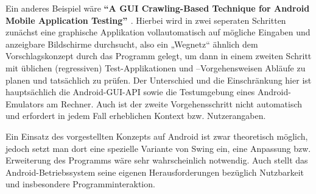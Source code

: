 Ein anderes Beispiel wäre \textbf{``A GUI Crawling-Based Technique for Android Mobile Application
Testing'' \cite{AGCBTFAMAT}}. Hierbei wird in zwei seperaten Schritten zunächst eine graphische Applikation
vollautomatisch auf mögliche Eingaben und anzeigbare Bildschirme durchsucht, also ein
„Wegnetz“ ähnlich dem Vorschlagskonzept durch das Programm gelegt, um dann in einem zweiten
Schritt mit üblichen (regressiven) Test-Applikationen und –Vorgehensweisen Abläufe zu
planen und tatsächlich zu prüfen. Der Unterschied und die Einschränkung hier ist
hauptsächlich die Android-GUI-API sowie die Testumgebung eines Android-Emulators am
Rechner. Auch ist der zweite Vorgehensschritt nicht automatisch und erfordert in jedem Fall
erheblichen Kontext bzw. Nutzerangaben.

Ein Einsatz des vorgestellten Konzepts auf Android ist zwar theoretisch möglich, jedoch setzt
man dort eine spezielle Variante von Swing ein, eine Anpassung bzw. Erweiterung des Programms
wäre sehr wahrscheinlich notwendig. Auch stellt das Android-Betriebssystem seine eigenen Herausforderungen
bezüglich Nutzbarkeit und insbesondere Programminteraktion.
